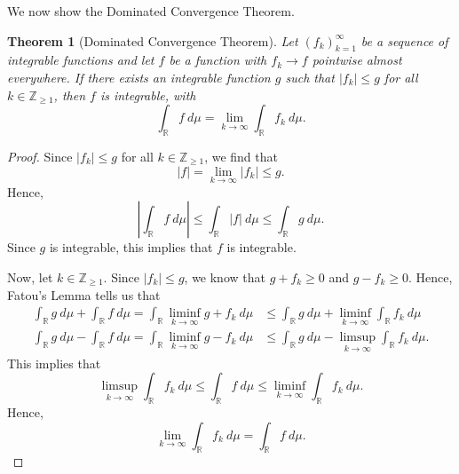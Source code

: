 \documentclass[a4paper, openany]{memoir}
\theoremstyle{definition}
\theoremstyle{plain}
\newtheorem{theorem}[definition]{Theorem}
\begin{document}
    We now show the Dominated Convergence Theorem.
    \begin{theorem}[Dominated Convergence Theorem]
        Let $(f_k)_{k=1}^\infty$ be a sequence of integrable functions and let $f$ be a function with $f_k \to f$ pointwise almost everywhere. If there exists an integrable function $g$ such that $|f_k| \leq g$ for all $k \in \mathbb{Z}_{\geq 1}$, then $f$ is integrable, with
        \[\int_{\mathbb{R}} f \ d\mu = \lim_{k \to \infty} \int_{\mathbb{R}} f_k \ d\mu.\]
    \end{theorem}
    \begin{proof}
        Since $|f_k| \leq g$ for all $k \in \mathbb{Z}_{\geq 1}$, we find that
        \[|f| = \lim_{k \to \infty} |f_k| \leq g.\]
        Hence,
        \[\left|\int_{\mathbb{R}} f \ d\mu\right| \leq \int_{\mathbb{R}} |f| \ d\mu \leq \int_{\mathbb{R}} g \ d\mu.\]
        Since $g$ is integrable, this implies that $f$ is integrable.

        Now, let $k \in \mathbb{Z}_{\geq 1}$. Since $|f_k| \leq g$, we know that $g + f_k \geq 0$ and $g - f_k \geq 0$. Hence, Fatou's Lemma tells us that
        \begin{align*}
            \int_{\mathbb{R}} g \ d\mu + \int_{\mathbb{R}} f \ d\mu = \int_{\mathbb{R}} \liminf_{k \to \infty} g + f_k \ d\mu &\leq \int_{\mathbb{R}} g \ d\mu + \liminf_{k \to \infty} \int_{\mathbb{R}} f_k \ d\mu \\
            \int_{\mathbb{R}} g \ d\mu - \int_{\mathbb{R}} f \ d\mu = \int_{\mathbb{R}} \liminf_{k \to \infty} g - f_k \ d\mu &\leq \int_{\mathbb{R}} g \ d\mu - \limsup_{k \to \infty} \int_{\mathbb{R}} f_k \ d\mu.
        \end{align*}
        This implies that
        \[\limsup_{k \to \infty} \int_{\mathbb{R}} f_k \ d\mu \leq \int_{\mathbb{R}} f \ d\mu \leq \liminf_{k \to \infty} \int_{\mathbb{R}} f_k \ d\mu.\]
        Hence,
        \[\lim_{k \to \infty} \int_{\mathbb{R}} f_k \ d\mu = \int_{\mathbb{R}} f \ d\mu.\]
    \end{proof}
\end{document}

